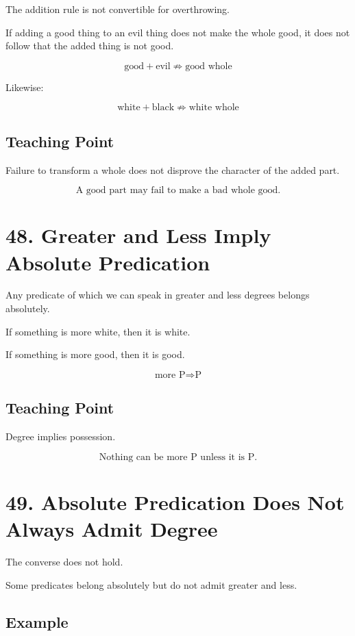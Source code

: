 \documentclass[12pt]{article}
\begin{document}
The addition rule is not convertible for overthrowing.

If adding a good thing to an evil thing does not make the whole good, it does
not follow that the added thing is not good.

\[
\text{good} + \text{evil} \not\Rightarrow \text{good whole}
\]

Likewise:

\[
\text{white} + \text{black} \not\Rightarrow \text{white whole}
\]

\subsection*{Teaching Point}

Failure to transform a whole does not disprove the character of the added
part.

\[
\boxed{
\text{A good part may fail to make a bad whole good.}
}
\]

\section*{48. Greater and Less Imply Absolute Predication}

Any predicate of which we can speak in greater and less degrees belongs
absolutely.

If something is more white, then it is white.

If something is more good, then it is good.

\[
\text{more P} \Rightarrow \text{P}
\]

\subsection*{Teaching Point}

Degree implies possession.

\[
\boxed{
\text{Nothing can be more P unless it is P.}
}
\]

\section*{49. Absolute Predication Does Not Always Admit Degree}

The converse does not hold.

Some predicates belong absolutely but do not admit greater and less.

\subsection*{Example}
\end{document}

